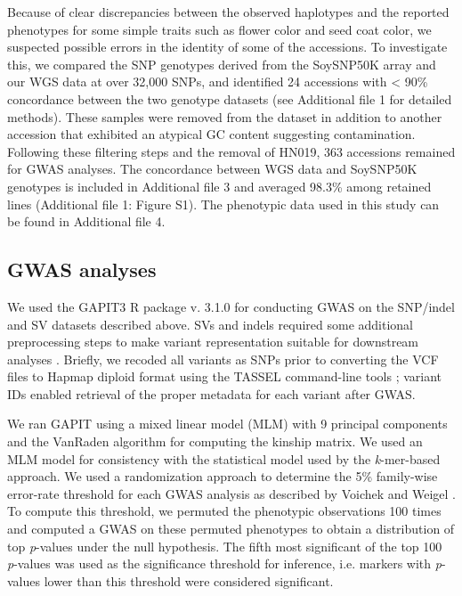 \documentclass{article}
\begin{document}
Because of clear discrepancies between the observed haplotypes and the reported
phenotypes for some simple traits such as flower color and seed coat color, we
suspected possible errors in the identity of some of the accessions. To
investigate this, we compared the SNP genotypes derived from the SoySNP50K
array and our WGS data at over 32,000 SNPs, and identified 24 accessions with <
90\% concordance between the two genotype datasets (see Additional file 1 for
detailed methods). These samples were removed from the dataset in addition to another
accession that exhibited an atypical GC content suggesting contamination.
Following these filtering steps and the removal of HN019, 363 accessions
remained for GWAS analyses. The concordance between WGS data and SoySNP50K
genotypes is included in Additional file 3 and averaged 98.3\% among retained
lines (Additional file 1: Figure S1). The phenotypic data used in this study can be found in Additional file 4.

\subsection*{GWAS analyses}

We used the GAPIT3 R package v. 3.1.0 \citep{wang2021} for conducting GWAS on
the SNP/indel and SV datasets described above. SVs and indels required some additional
preprocessing steps to make variant
representation suitable for downstream analyses \citep{lemay2022gwas}. Briefly, we recoded all
variants as SNPs prior to converting the VCF files to Hapmap diploid format
using the TASSEL command-line tools \citep{bradbury2007}; variant IDs enabled
retrieval of the proper metadata for each variant after GWAS.

We ran GAPIT using a mixed linear model (MLM) with 9 principal components and the VanRaden
algorithm for computing the kinship matrix. We used an MLM model for
consistency with the statistical model used by the \textit{k}-mer-based
approach.  We used a randomization approach to determine the 5\% family-wise
error-rate threshold for each GWAS analysis as described by Voichek and Weigel \cite{voichek2020}.
To compute this threshold, we permuted the phenotypic observations 100 times
and computed a GWAS on these permuted phenotypes to obtain a distribution of
top \emph{p}-values under the null hypothesis. The fifth most significant of
the top 100 \emph{p}-values was used as the significance threshold for
inference, i.e. markers with \emph{p}-values lower than this threshold were
considered significant.
\end{document}
